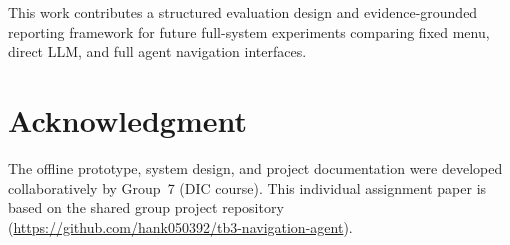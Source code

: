 \documentclass[conference]{IEEEtran}
\begin{document}
This work contributes a structured evaluation design and evidence-grounded reporting
framework for future full-system experiments comparing fixed menu, direct LLM, and
full agent navigation interfaces.

\section*{Acknowledgment}

The offline prototype, system design, and project documentation were developed
collaboratively by Group~7 (DIC course). This individual assignment paper is based
on the shared group project repository
(\url{https://github.com/hank050392/tb3-navigation-agent}).



\end{document}
